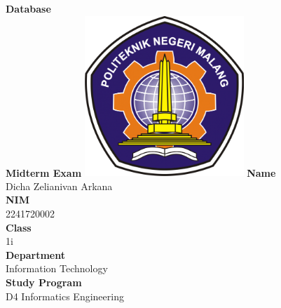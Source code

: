 \documentclass[12pt,titlepage]{article}
\newcommand{\vSubject}{Database}
\newcommand{\vSubtitle}{Midterm Exam}
\newcommand{\vName}{Dicha Zelianivan Arkana}
\newcommand{\vNIM}{2241720002}
\newcommand{\vClass}{1i}
\newcommand{\vDepartment}{Information Technology}
\newcommand{\vStudyProgram}{D4 Informatics Engineering}
\begin{document}
\begin{titlepage}
    \centering
    \vfill
    {\bfseries\LARGE
        \vSubject\\
        \vskip0.25cm
        \vSubtitle
    }
    \vfill
    \includegraphics[width=6cm]{images/polinema-logo.png}
    \vfill
    {
        \textbf{Name}\\
        \vName\\
        \vskip0.5cm
        \textbf{NIM}\\
        \vNIM\\
        \vskip0.5cm
        \textbf{Class}\\
        \vClass\\
        \vskip0.5cm
        \textbf{Department}\\
        \vDepartment\\
        \vskip0.5cm
        \textbf{Study Program}\\
        \vStudyProgram
    }
\end{titlepage}
\end{document}

